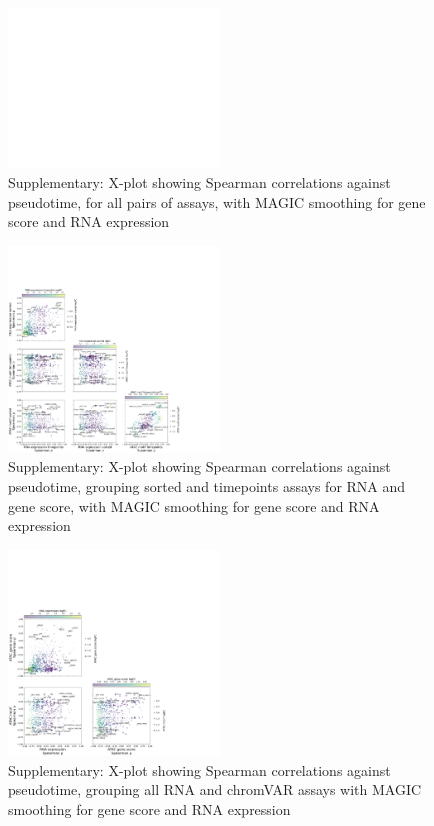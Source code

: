 \documentclass[a4paper]{article}
\begin{document}
\begin{figure}[!htb]
  \centering
  \includegraphics[width=0.5\textwidth]{../figures/hematopoiesis/Neutrophil_40_106_smooth_magic_detailed_X_plot.png}
  \caption{Supplementary: X-plot showing Spearman correlations against pseudotime, for all pairs of assays, with MAGIC smoothing for gene score and RNA expression}
\end{figure}

\begin{figure}[!htb]
  \centering
  \includegraphics[width=0.5\textwidth]{../figures/hematopoiesis/Neutrophil_40_106_smooth_magic_semi_detailed_X_plot.png}
  \caption{Supplementary: X-plot showing Spearman correlations against pseudotime, grouping sorted and timepoints assays for RNA and gene score, with MAGIC smoothing for gene score and RNA expression}
\end{figure}

\begin{figure}[!htb]
  \centering
  \includegraphics[width=0.5\textwidth]{../figures/hematopoiesis/Neutrophil_40_106_smooth_magic_grouped_X_plot.png}
  \caption{Supplementary: X-plot showing Spearman correlations against pseudotime, grouping all RNA and chromVAR assays with MAGIC smoothing for gene score and RNA expression}
\end{figure}
\end{document}
